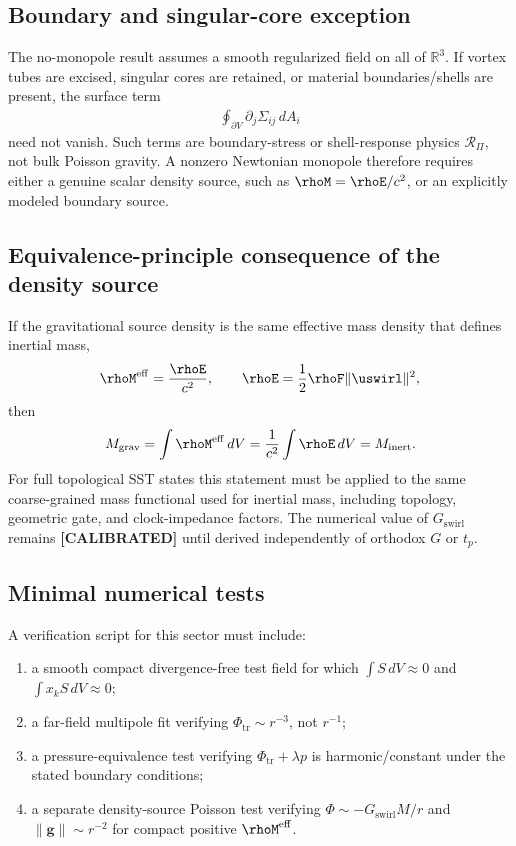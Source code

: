 \subsection{Boundary and singular-core exception}
The no-monopole result assumes a smooth regularized field on all of
\(\mathbb{R}^3\).  If vortex tubes are excised, singular cores are retained,
or material boundaries/shells are present, the surface term
\begin{align}
    \oint_{\partial V}\partial_j\Sigma_{ij}\,dA_i
\end{align}
need not vanish.  Such terms are boundary-stress or shell-response physics
\(\mathcal{R}_{\Pi}\), not bulk Poisson gravity.  A nonzero Newtonian monopole
therefore requires either a genuine scalar density source, such as
\(\rhoM=\rhoE/c^2\), or an explicitly modeled boundary source.

\subsection{Equivalence-principle consequence of the density source}
If the gravitational source density is the same effective mass density that
defines inertial mass,
\begin{align}
    \rhoM^{\mathrm{eff}}
    =
    \frac{\rhoE}{c^2},
    \qquad
    \rhoE=\frac{1}{2}\rhoF\lVert\uswirl\rVert^2,
\end{align}
then
\begin{align}
    M_{\mathrm{grav}}
    =
    \int\rhoM^{\mathrm{eff}}\,dV
    =
    \frac{1}{c^2}\int\rhoE\,dV
    =
    M_{\mathrm{inert}} .
\end{align}
For full topological SST states this statement must be applied to the same
coarse-grained mass functional used for inertial mass, including topology,
geometric gate, and clock-impedance factors.  The numerical value of
\(G_{\mathrm{swirl}}\) remains \textbf{[CALIBRATED]} until derived
independently of orthodox \(G\) or \(t_p\).

\subsection{Minimal numerical tests}
A verification script for this sector must include:
\begin{enumerate}
    \item a smooth compact divergence-free test field for which
    \(\int S\,dV\approx0\) and \(\int x_kS\,dV\approx0\);
    \item a far-field multipole fit verifying
    \(\Phi_{\mathrm{tr}}\sim r^{-3}\), not \(r^{-1}\);
    \item a pressure-equivalence test verifying
    \(\Phi_{\mathrm{tr}}+\lambda p\) is harmonic/constant under the stated
    boundary conditions;
    \item a separate density-source Poisson test verifying
    \(\Phi\sim -G_{\mathrm{swirl}}M/r\) and
    \(\lVert\mathbf{g}\rVert\sim r^{-2}\) for compact positive
    \(\rhoM^{\mathrm{eff}}\).
\end{enumerate}

